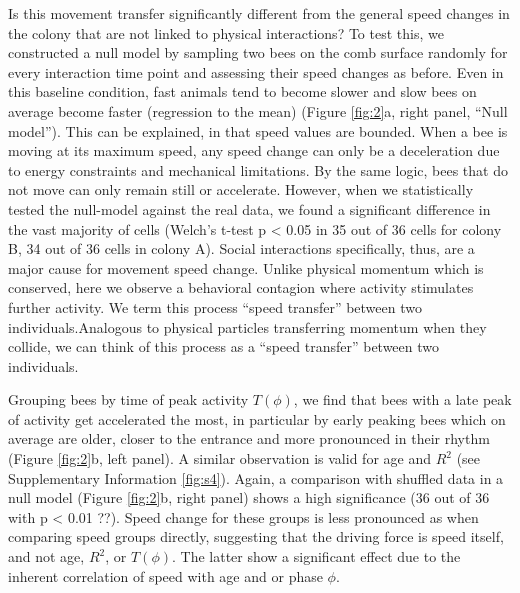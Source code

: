 \documentclass{article}
\newcommand{\added}[1]{{\color{blue}#1}}
\newcommand{\deleted}[1]{{\color{red}#1}} %
\newcommand{\replaced}[2]{\deleted{#1}\added{#2}}
\newcommand{\added}[1]{#1}
\newcommand{\deleted}[1]{}
\newcommand{\replaced}[2]{#2}
\begin{document}
Is this movement transfer significantly different from the general speed changes in the colony that are not linked to physical interactions? To test this, we constructed a null model by sampling two bees on the comb surface randomly for every interaction time point and assessing their speed changes as before. Even in this baseline condition, fast animals tend to become slower and slow bees on average become faster \added{(regression to the mean)} (Figure \ref{fig:2}a, right panel, “Null model”). This can be explained, in that speed values are bounded. When a bee is moving at its maximum speed, any speed change can only be a deceleration due to energy constraints and mechanical limitations. By the same logic, bees that do not move can only remain still or accelerate. However, when we statistically tested the null-model against the real data, we found a significant difference in the vast majority of cells (Welch’s t-test p < 0.05 in 35 out of 36 cells for colony B, 34 out of 36 cells in colony A). Social interactions specifically, thus, are a major cause for movement speed change. \replaced{Unlike physical momentum which is conserved, here we observe a behavioral contagion where activity stimulates further activity. We term this process “speed transfer” between two individuals.}{Analogous to physical particles transferring momentum when they collide, we can think of this process as a “speed transfer” between two individuals.} 

Grouping bees by time of peak activity $T(\phi)$, we find that bees with a late peak of activity get accelerated the most, in particular by early peaking bees which on average are older, closer to the entrance and more pronounced in their rhythm (Figure \ref{fig:2}b, left panel). A similar observation is valid for age and $R^2$ (see Supplementary Information \ref{fig:s4}). Again, a comparison with shuffled data in a null model (Figure \ref{fig:2}b, right panel) shows a high significance (36 out of 36 with p < 0.01 ??). Speed change for these groups is less pronounced as when comparing speed groups directly, suggesting that the driving force is speed itself, and not age, $R^2$, or $T(\phi)$. The latter show a significant effect due to the inherent correlation of speed with age and or phase $\phi$.
\end{document}
